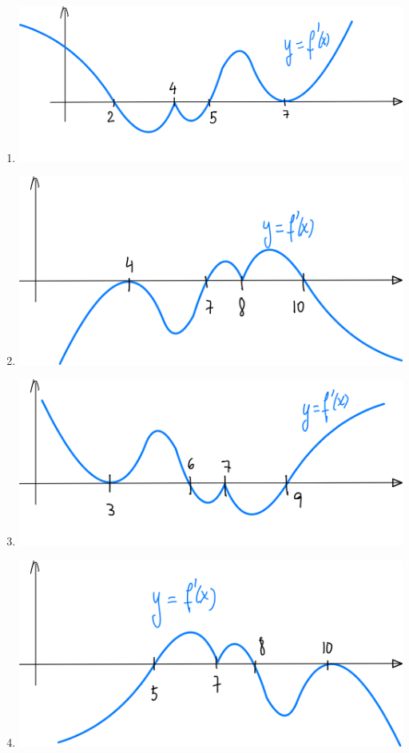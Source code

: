 \begin{multicols}{2}
  \begin{enumerate}
    \item \includegraphics[width=.4\textwidth]{pics/max-min-locales-ej-a.png}
    \item \includegraphics[width=.4\textwidth]{pics/max-min-locales-ej-b.png}
    \item \includegraphics[width=.4\textwidth]{pics/max-min-locales-ej-c.png}
    \item \includegraphics[width=.4\textwidth]{pics/max-min-locales-ej-d.png}
  \end{enumerate}
  
\end{multicols}
